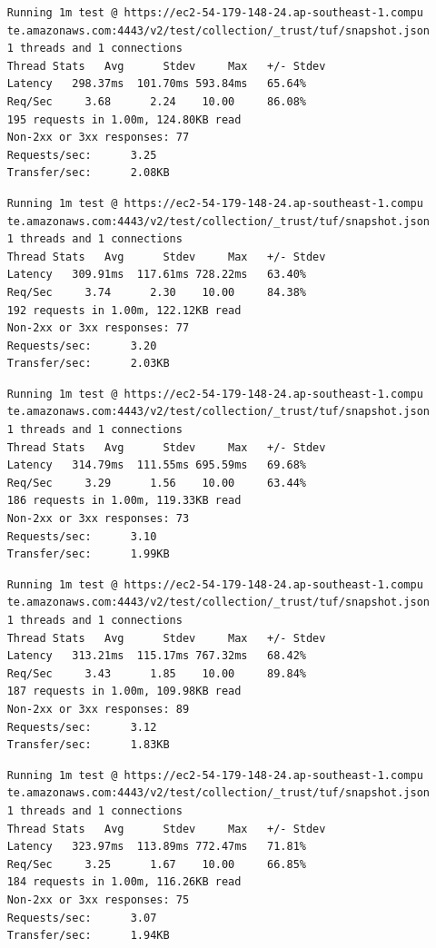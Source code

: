 \documentclass[a4paper,12pt]{article}
\newcounter{subsubsubsection}[subsubsection]
\begin{document}
{{	
	\begin{verbatim}
	Running 1m test @ https://ec2-54-179-148-24.ap-southeast-1.compu
	te.amazonaws.com:4443/v2/test/collection/_trust/tuf/snapshot.json
	1 threads and 1 connections
	Thread Stats   Avg      Stdev     Max   +/- Stdev
	Latency   298.37ms  101.70ms 593.84ms   65.64%
	Req/Sec     3.68      2.24    10.00     86.08%
	195 requests in 1.00m, 124.80KB read
	Non-2xx or 3xx responses: 77
	Requests/sec:      3.25
	Transfer/sec:      2.08KB
	\end{verbatim}
	\begin{verbatim}
	Running 1m test @ https://ec2-54-179-148-24.ap-southeast-1.compu
	te.amazonaws.com:4443/v2/test/collection/_trust/tuf/snapshot.json
	1 threads and 1 connections
	Thread Stats   Avg      Stdev     Max   +/- Stdev
	Latency   309.91ms  117.61ms 728.22ms   63.40%
	Req/Sec     3.74      2.30    10.00     84.38%
	192 requests in 1.00m, 122.12KB read
	Non-2xx or 3xx responses: 77
	Requests/sec:      3.20
	Transfer/sec:      2.03KB
	\end{verbatim}
	\begin{verbatim}
	Running 1m test @ https://ec2-54-179-148-24.ap-southeast-1.compu
	te.amazonaws.com:4443/v2/test/collection/_trust/tuf/snapshot.json
	1 threads and 1 connections
	Thread Stats   Avg      Stdev     Max   +/- Stdev
	Latency   314.79ms  111.55ms 695.59ms   69.68%
	Req/Sec     3.29      1.56    10.00     63.44%
	186 requests in 1.00m, 119.33KB read
	Non-2xx or 3xx responses: 73
	Requests/sec:      3.10
	Transfer/sec:      1.99KB
	\end{verbatim}
	\begin{verbatim}
	Running 1m test @ https://ec2-54-179-148-24.ap-southeast-1.compu
	te.amazonaws.com:4443/v2/test/collection/_trust/tuf/snapshot.json
	1 threads and 1 connections
	Thread Stats   Avg      Stdev     Max   +/- Stdev
	Latency   313.21ms  115.17ms 767.32ms   68.42%
	Req/Sec     3.43      1.85    10.00     89.84%
	187 requests in 1.00m, 109.98KB read
	Non-2xx or 3xx responses: 89
	Requests/sec:      3.12
	Transfer/sec:      1.83KB
	\end{verbatim}
	\newpage
	\begin{verbatim}
	Running 1m test @ https://ec2-54-179-148-24.ap-southeast-1.compu
	te.amazonaws.com:4443/v2/test/collection/_trust/tuf/snapshot.json
	1 threads and 1 connections
	Thread Stats   Avg      Stdev     Max   +/- Stdev
	Latency   323.97ms  113.89ms 772.47ms   71.81%
	Req/Sec     3.25      1.67    10.00     66.85%
	184 requests in 1.00m, 116.26KB read
	Non-2xx or 3xx responses: 75
	Requests/sec:      3.07
	Transfer/sec:      1.94KB
	\end{verbatim}
	\newpage
	
}}
\end{document}
